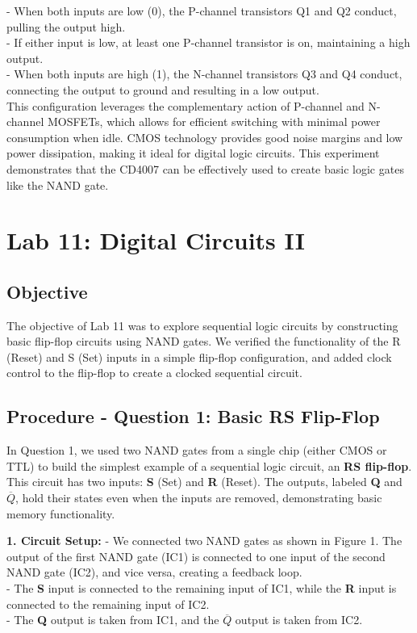 \documentclass{article}
\begin{document}
       - When both inputs are low (0), the P-channel transistors Q1 and Q2 conduct, pulling the output high.
       \\
       - If either input is low, at least one P-channel transistor is on, maintaining a high output.
       \\
       - When both inputs are high (1), the N-channel transistors Q3 and Q4 conduct, connecting the output to ground and resulting in a low output.
       \\
    
    This configuration leverages the complementary action of P-channel and N-channel MOSFETs, which allows for efficient switching with minimal power consumption when idle. CMOS technology provides good noise margins and low power dissipation, making it ideal for digital logic circuits. This experiment demonstrates that the CD4007 can be effectively used to create basic logic gates like the NAND gate.

\section*{Lab 11: Digital Circuits II}

    \subsection*{Objective}
    The objective of Lab 11 was to explore sequential logic circuits by constructing basic flip-flop circuits using NAND gates. We verified the functionality of the R (Reset) and S (Set) inputs in a simple flip-flop configuration, and added clock control to the flip-flop to create a clocked sequential circuit.

    \subsection*{\textbf{Procedure - Question 1: Basic RS Flip-Flop}}
    In Question 1, we used two NAND gates from a single chip (either CMOS or TTL) to build the simplest example of a sequential logic circuit, an \textbf{RS flip-flop}. This circuit has two inputs: \textbf{S} (Set) and \textbf{R} (Reset). The outputs, labeled \textbf{Q} and \textbf{\(\overline{Q}\)}, hold their states even when the inputs are removed, demonstrating basic memory functionality.

    \textbf{1. Circuit Setup:}
    - We connected two NAND gates as shown in Figure 1. The output of the first NAND gate (IC1) is connected to one input of the second NAND gate (IC2), and vice versa, creating a feedback loop.
    \\
    - The \textbf{S} input is connected to the remaining input of IC1, while the \textbf{R} input is connected to the remaining input of IC2.
    \\
    - The \textbf{Q} output is taken from IC1, and the \textbf{\(\overline{Q}\)} output is taken from IC2.
    \\
\end{document}
